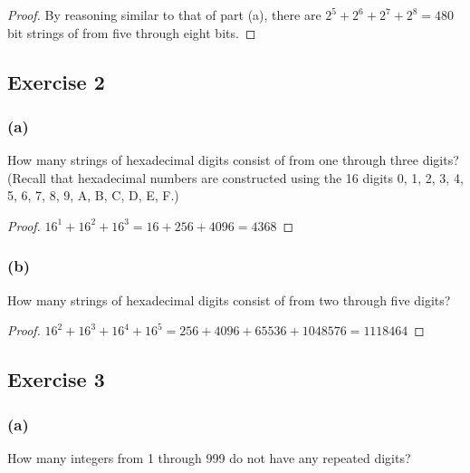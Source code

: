 \documentclass[14pt]{extarticle}
\begin{document}
\begin{proof}
     By reasoning similar to that of part (a), there are \(2^5 + 2^6 + 2^7 + 2^8 = 480\) bit strings of from five through
     eight bits.
\end{proof}

\subsection{Exercise 2}
\subsubsection{(a)}
How many strings of hexadecimal digits consist of from one through three digits? (Recall that hexadecimal numbers are
constructed using the 16 digits 0, 1, 2, 3, 4, 5, 6, 7, 8, 9, A, B, C, D, E, F.)

\begin{proof}
     \(16^1 + 16^2 + 16^3 = 16 + 256 + 4096 = 4368\)
\end{proof}

\subsubsection{(b)}
How many strings of hexadecimal digits consist of from two through five digits?

\begin{proof}
     \(16^2 + 16^3 + 16^4 + 16^5 = 256 + 4096 + 65536 + 1048576 = 1118464\)
\end{proof}

\subsection{Exercise 3}
\subsubsection{(a)}
How many integers from 1 through 999 do not have any repeated digits?
\end{document}
